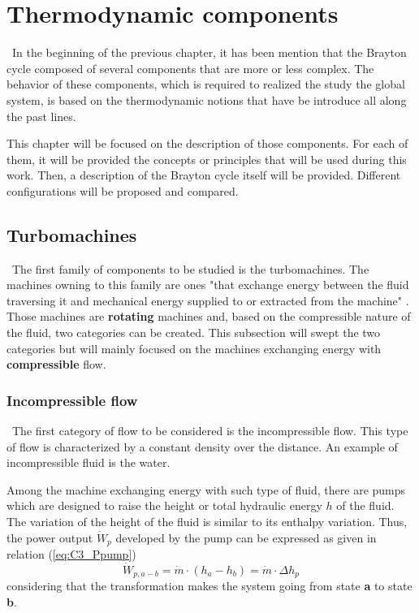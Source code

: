 \graphicspath{{Chapitre_3/Images/}}
\chapter{Thermodynamic components}\label{C3}
\quad\, In the beginning of the previous chapter, it has been mention that the Brayton cycle composed of several components that are more or less complex. The behavior of these components, which is required to realized the study the global system, is based on the thermodynamic notions that have be introduce all along the past lines.

This chapter will be focused on the description of those components. For each of them, it will be provided the concepts or principles that will be used during this work. Then, a description of the Brayton cycle itself will be provided. Different configurations will be proposed and compared.
\section{Turbomachines}
\quad\, The first family of components to be studied is the turbomachines. The machines owning to this family are ones "that exchange energy between the
fluid traversing it and mechanical energy supplied to or extracted from the machine" \cite{Hillewaert2019}. Those machines are \textbf{rotating} machines and, based on the compressible nature of the fluid, two categories can be created.
This subsection will swept the two categories but will mainly focused on the machines exchanging energy with \textbf{compressible} flow.

\subsection{Incompressible flow}
\quad\, The first category of flow to be considered is the incompressible flow. This type of flow is characterized by a constant density over the distance. An example of incompressible fluid is the water.

Among the machine exchanging energy with such type of fluid, there are pumps which are designed to raise the height or total hydraulic energy $h$ of the fluid. The variation of the height of the fluid is similar to its enthalpy variation. Thus, the power output  $\dot{W}_p$ developed by the pump can be expressed as given in relation (\ref{eq:C3_Ppump})
\begin{equation}
\dot{W}_{p,a-b} = \dot{m}\cdot (h_a - h_b)=\dot{m}\cdot\Delta h_p \label{eq:C3_Ppump}
\end{equation}
considering that the transformation makes the system going from state \textbf{a} to state \textbf{b}.

